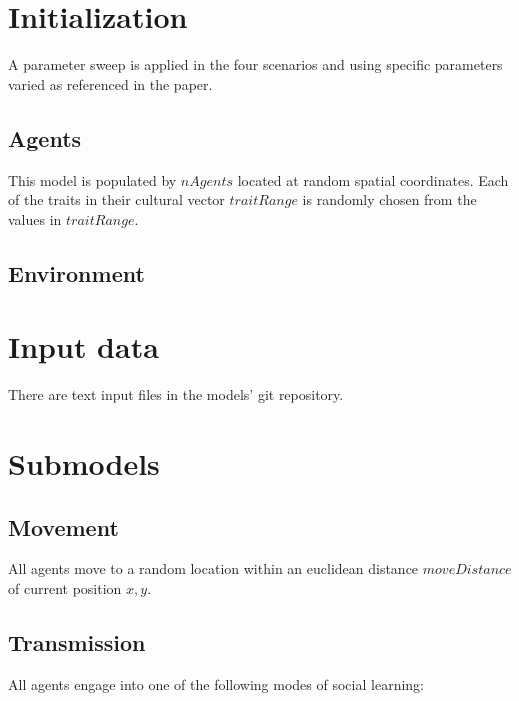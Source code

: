 \documentclass[11pt,a4paper,twocolumn,notitlepage]{article}
\begin{document}
\section{Initialization}

A parameter sweep is applied in the four scenarios and using specific parameters varied as referenced in the paper.

\subsection{Agents}

This model is populated by $nAgents$ located at random spatial coordinates. Each of the traits in their cultural vector $traitRange$ is randomly chosen from the values in $traitRange$.

\subsection{Environment}

\section{Input data}

There are text input files in the models' git repository. 

\section{Submodels}

\subsection{Movement}

All agents move to a random location within an euclidean distance $moveDistance$ of current position $x,y$.

\subsection{Transmission}
All agents engage into one of the following modes of social learning:


\end{document}
